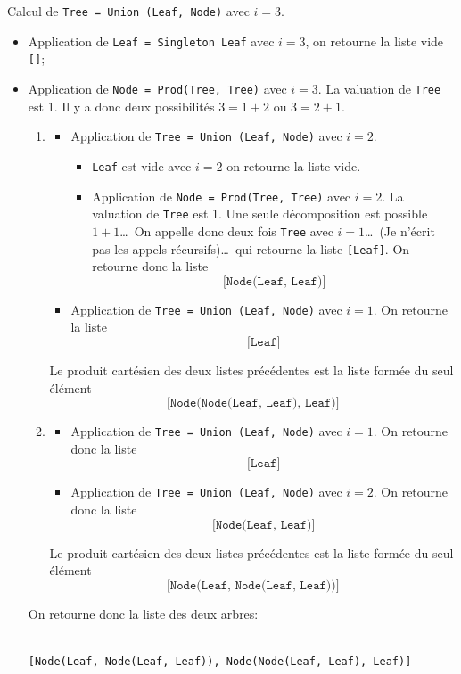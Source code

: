 \documentclass[11pt]{article}
\begin{document}
\noindent Calcul de \texttt{Tree = Union (Leaf, Node)} avec $i=3$.
\begin{itemize}
\item Application de \texttt{Leaf = Singleton Leaf} avec $i=3$, on retourne
  la liste vide \texttt{[]};
\item Application de \texttt{Node = Prod(Tree, Tree)} avec $i=3$. La valuation
  de \texttt{Tree} est 1. Il y a donc deux possibilités $3=1+2$ ou $3=2+1$.
  \begin{enumerate}
  \item \begin{itemize}  
    \item Application de \texttt{Tree = Union (Leaf, Node)} avec $i=2$.
      \begin{itemize}
      \item \texttt{Leaf} est vide avec $i=2$ on retourne la liste vide.
      \item Application de \texttt{Node = Prod(Tree, Tree)} avec $i=2$. La
        valuation de \texttt{Tree} est 1. Une seule décomposition est possible
        $1+1$\dots\ On appelle donc deux fois \texttt{Tree} avec $i=1$\dots\ 
        (Je n'écrit pas les appels récursifs)\dots\ qui retourne la liste
        \texttt{[Leaf]}. On retourne donc la liste
        $$\texttt{[Node(Leaf, Leaf)]}$$
      \end{itemize}
    \item Application de \texttt{Tree = Union (Leaf, Node)} avec $i=1$.
      On retourne la liste 
        $$\texttt{[Leaf]}$$
    \end{itemize}
    Le produit cartésien des deux listes précédentes est la liste formée du
    seul élément
    $$\texttt{[Node(Node(Leaf, Leaf), Leaf)]}$$
  \item \begin{itemize}  
    \item Application de \texttt{Tree = Union (Leaf, Node)} avec $i=1$.
      On retourne donc la liste
      $$\texttt{[Leaf]}$$
    \item Application de \texttt{Tree = Union (Leaf, Node)} avec $i=2$.
      On retourne donc la liste
      $$\texttt{[Node(Leaf, Leaf)]}$$
    \end{itemize}
    Le produit cartésien des deux listes précédentes est la liste formée du
    seul élément
    $$\texttt{[Node(Leaf, Node(Leaf, Leaf))]}$$
  \end{enumerate}
  On retourne donc la liste des deux arbres:
\begin{verbatim}

[Node(Leaf, Node(Leaf, Leaf)), Node(Node(Leaf, Leaf), Leaf)]

\end{verbatim}
\end{itemize}
\bigskip
\end{document}
